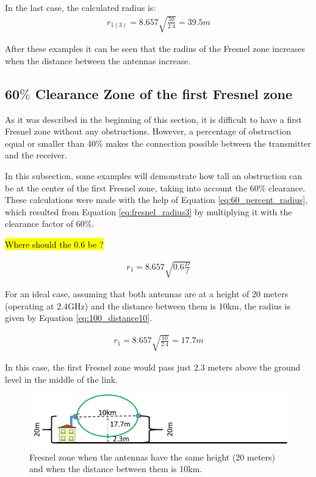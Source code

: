 In the last case, the calculated radius is:
\begin{align*}
r_{1(3)} = 8.657\sqrt{\frac{50}{2.4}} = 39.5m
\end{align*}

After these examples it can be seen that the radius of the Fresnel zone increases when the distance between the antennas increase.

\subsection{60$\%$ Clearance Zone of the first Fresnel zone}
As it was described in the beginning of this section, it is difficult to have a first Fresnel zone without any obstructions. However, a percentage of obstruction equal or smaller than 40$\%$ makes the connection possible between the transmitter and the receiver.

In this subsection, some examples will demonstrate how tall an obstruction can be at the center of the first Fresnel zone, taking into account the 60$\%$ clearance. These calculations were made with the help of Equation \ref{eq:60_percent_radius}, which resulted from Equation \ref{eq:fresnel_radius3} by multiplying it with the clearance factor of 60$\%$.

\hl{Where should the 0.6 be ?}

\begin{align}
r_1 = 8.657\sqrt{0.6\frac{D}{f}}\label{eq:60_percent_radius}
\end{align}

For an ideal case, assuming that both antennas are at a height of 20 meters (operating at 2.4GHz) and the distance between them is 10km, the radius is given by Equation \ref{eq:100_distance10}.

\begin{align}
r_1 = 8.657\sqrt{\frac{10}{2.4}} = 17.7m\label{eq:100_distance10}
\end{align}

In this case, the first Fresnel zone would pass just 2.3 meters above the ground level in the middle of the link. 

\begin{figure}[H]
	\centering
	\includegraphics[scale=0.50]{figures/fresnel_10km_height.png}
	\caption{Fresnel zone when the antennas have the same height (20 meters) and when the distance between them is 10km.}
	\label{fig:fresnel_zones_10km_height}
\end{figure}  

